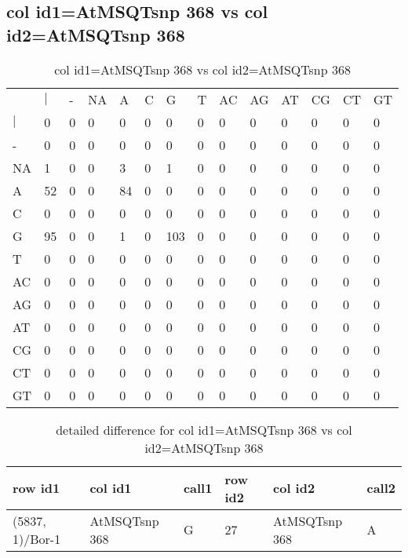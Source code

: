 \subsection{col id1=AtMSQTsnp 368 vs col id2=AtMSQTsnp 368}
\begin{center}
\begin{longtable}{|l|l|l|l|l|l|l|l|l|l|l|l|l|l|}
\caption{col id1=AtMSQTsnp 368 vs col id2=AtMSQTsnp 368} \label{table_dm880}\\
\hline
\\
\hline
&$|$&-&NA&A&C&G&T&AC&AG&AT&CG&CT&GT\\
$|$&0&0&0&0&0&0&0&0&0&0&0&0&0\\
-&0&0&0&0&0&0&0&0&0&0&0&0&0\\
NA&1&0&0&3&0&1&0&0&0&0&0&0&0\\
A&52&0&0&84&0&0&0&0&0&0&0&0&0\\
C&0&0&0&0&0&0&0&0&0&0&0&0&0\\
G&95&0&0&1&0&103&0&0&0&0&0&0&0\\
T&0&0&0&0&0&0&0&0&0&0&0&0&0\\
AC&0&0&0&0&0&0&0&0&0&0&0&0&0\\
AG&0&0&0&0&0&0&0&0&0&0&0&0&0\\
AT&0&0&0&0&0&0&0&0&0&0&0&0&0\\
CG&0&0&0&0&0&0&0&0&0&0&0&0&0\\
CT&0&0&0&0&0&0&0&0&0&0&0&0&0\\
GT&0&0&0&0&0&0&0&0&0&0&0&0&0\\
\hline
\end{longtable}
\end{center}

\begin{center}
\begin{longtable}{|l|l|l|l|l|l|}
\caption{detailed difference for col id1=AtMSQTsnp 368 vs col id2=AtMSQTsnp 368} \label{table_dm881}\\
\hline
row id1&col id1&call1&row id2&col id2&call2\\
\hline
(5837, 1)/Bor-1&AtMSQTsnp 368&G&27&AtMSQTsnp 368&A\\
\hline
\end{longtable}
\end{center}

